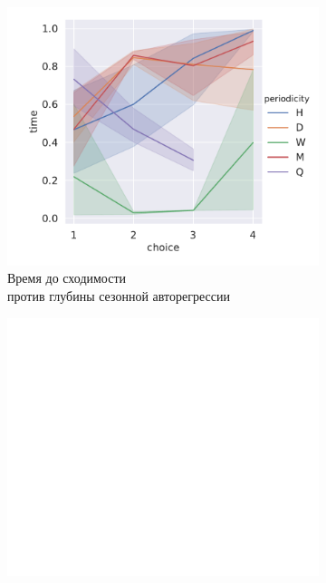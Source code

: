 \documentclass[a4paper,14pt]{extarticle}
\begin{document}
\begin{enumerate}
\begin{figure}[!h]
\begin{subfigure}[b]{.5\linewidth}
				\includegraphics[width=\linewidth]{pictures/hyper-seas_depth-time.pdf}
				\caption{Время до сходимости \\ против глубины сезонной авторегрессии}
				\label{hyper:seas_depth:time}
			\end{subfigure}%
			\begin{subfigure}[b]{.5\linewidth}
				\centering
				\includegraphics[width=\linewidth]{pictures/hyper-seas_depth-mse.pdf}

\end{subfigure}
\end{figure}
\end{enumerate}
\end{document}
